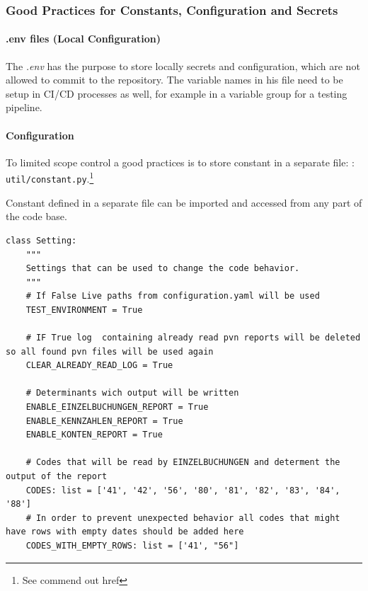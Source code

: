 \subsubsection{Good Practices for Constants, Configuration and Secrets}

\paragraph{.env files (Local Configuration)}
The \textit{.env} has the purpose to store locally secrets and configuration, which are not allowed to commit to the repository. The variable names in his file need to be setup in \gls{CI}/\gls{CD} processes as well, for example in a variable group for a testing pipeline.

\paragraph{Configuration}
To limited scope control a good practices is to store constant in a separate file: : \verb+util/constant.py+.\footnote{See commend out href
}

Constant defined in a separate file can be imported and accessed from any part of the code base. 


\begin{lstlisting}[language=iPython, caption={Installing Azure ML SDK core package},captionpos=b]
	class Setting:
	"""
	Settings that can be used to change the code behavior.
	"""
	# If False Live paths from configuration.yaml will be used
	TEST_ENVIRONMENT = True
	
	# IF True log  containing already read pvn reports will be deleted so all found pvn files will be used again
	CLEAR_ALREADY_READ_LOG = True
	
	# Determinants wich output will be written
	ENABLE_EINZELBUCHUNGEN_REPORT = True
	ENABLE_KENNZAHLEN_REPORT = True
	ENABLE_KONTEN_REPORT = True
	
	# Codes that will be read by EINZELBUCHUNGEN and determent the output of the report
	CODES: list = ['41', '42', '56', '80', '81', '82', '83', '84', '88']
	# In order to prevent unexpected behavior all codes that might have rows with empty dates should be added here
	CODES_WITH_EMPTY_ROWS: list = ['41', "56"]
\end{lstlisting}

